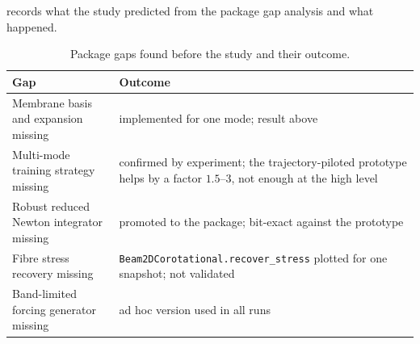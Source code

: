  records what the study predicted from the package gap analysis and what happened.

\begin{table}[tbp]
\centering\footnotesize
\caption{Package gaps found before the study and their outcome.}\label{tab:vf-ice-gaps}
\begin{tabularx}{\linewidth}{@{}>{\raggedright\arraybackslash}p{4.2cm} >{\raggedright\arraybackslash}X@{}}
\toprule
Gap & Outcome\\
\midrule
Membrane basis and expansion missing & implemented for one mode; result above\\
Multi-mode training strategy missing & confirmed by experiment; the trajectory-piloted prototype helps by a factor $1.5$--$3$, not enough at the high level\\
Robust reduced Newton integrator missing & promoted to the package; bit-exact against the prototype\\
Fibre stress recovery missing & \texttt{Beam2DCorotational.recover\_stress} plotted for one snapshot; not validated\\
Band-limited forcing generator missing & ad hoc version used in all runs\\
\bottomrule
\end{tabularx}
\end{table}
